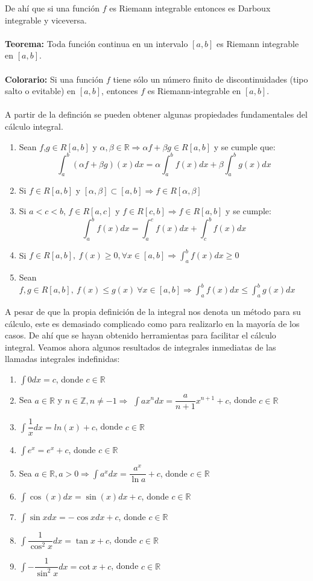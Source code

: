 \documentclass{article}
\begin{document}
De ahí que si una función $f$ es Riemann integrable entonces es Darboux integrable y viceversa.
\\ \\
{\bf Teorema:} Toda función continua en un intervalo $[a,b]$ es Riemann integrable en $[a,b]$.\\ \\
{\bf Colorario:} Si una función $f$ tiene sólo un número finito de discontinuidades (tipo salto o evitable) en $[a, b]$, entonces $f$ es Riemann-integrable en $[a, b]$.\\ \\
A partir de la definción se pueden obtener algunas propiedades fundamentales del cálculo integral.
\begin{enumerate}
	\item Sean $f$,$g\in R[a,b]$ y $\alpha,\beta\in\mathbb{R}\Rightarrow \alpha f+\beta g\in R[a,b]$ y se cumple que:
	$$\int_a^b(\alpha f+\beta g)(x)dx=\alpha\int_a^b f(x)dx+\beta\int_a^bg(x)dx$$
	\item Si $f\in R[a,b]$ y $[\alpha,\beta]\subset[a,b]\Rightarrow f\in R[\alpha,\beta]$
	\item Si $a<c<b$, $f\in R[a,c]$ y $f\in R[c,b]\Rightarrow f\in R[a,b]$ y se cumple:
	$$\int_a^b f(x)dx=\int_a^cf(x)dx+\int_c^bf(x)dx$$
	\item Si $\displaystyle f\in R[a,b],\ f(x)\geq 0, \forall x\in[a,b]\Rightarrow \int_a^bf(x)dx\geq0$
	\item Sean $\displaystyle f,g\in R[a,b],\ f(x)\leq g(x)\ \forall x\in[a,b]\Rightarrow \int_a^bf(x)dx\leq\int_a^bg(x)dx$
\end{enumerate}
A pesar de que la propia definición de la integral nos denota un método para su cálculo, este es demasiado complicado como para realizarlo en la mayoría de los casos. De ahí que se hayan obtenido herramientas para facilitar el cálculo integral. Veamos ahora algunos resultados de integrales inmediatas de las llamadas integrales indefinidas:
\begin{enumerate}
	\item $\displaystyle \int 0dx=c$, donde $c\in\mathbb{R}$
	\item Sea $a\in\mathbb{R}$ y $n\in\mathbb{Z}, n\neq-1\Rightarrow$ $\displaystyle \int ax^ndx=\dfrac{a}{n+1}x^{n+1}+c$, donde $c\in\mathbb{R}$
	\item $\displaystyle\int\dfrac{1}{x}dx=ln(x)+c$, donde $c\in\mathbb{R}$
	\item $\displaystyle\int e^x=e^x+c$, donde $c\in\mathbb{R}$
	\item Sea $\displaystyle a\in\mathbb{R}, a>0\Rightarrow \int a^xdx=\dfrac{a^x}{\ln a}+c$, donde $c\in\mathbb{R}$
	\item $\displaystyle \int\cos(x)dx=\sin(x)dx+c$, donde $c\in\mathbb{R}$
	\item $\displaystyle \int\sin xdx=-\cos xdx+c$, donde $c\in\mathbb{R}$
	\item $\displaystyle \int\dfrac{1}{\cos^2 x}dx=\tan x+c$, donde $c\in\mathbb{R}$
	\item $\displaystyle \int-\dfrac{1}{\sin^2 x}dx=\text{cot}\ x+c$, donde $c\in\mathbb{R}$
\end{enumerate}
\end{document}
